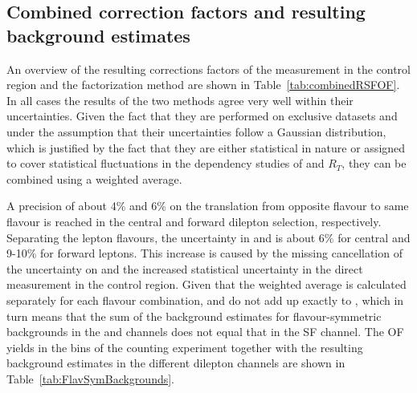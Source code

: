 \subsection{Combined correction factors and resulting background estimates}
\label{sec:combinedRSFOF}
An overview of the resulting corrections factors of the measurement in the control region and the factorization method are shown in Table~\ref{tab:combinedRSFOF}. In all cases the results of the two methods agree very well within their uncertainties. Given the fact that they are performed on exclusive datasets and under the assumption that their uncertainties follow a Gaussian distribution, which is justified by the fact that they are either statistical in nature or assigned to cover statistical fluctuations in the dependency studies of \rmue and $R_T$, they can be combined using a weighted average. 
 
A precision of about 4\% and 6\% on the translation from opposite flavour to same flavour is reached in the central and forward dilepton selection, respectively. Separating the lepton flavours, the uncertainty in \Reeof and \Rmmof is about 6\% for central and 9-10\% for forward leptons. This increase is caused by the missing cancellation of the uncertainty on \rmue and the increased statistical uncertainty in the direct measurement in the control region. Given that the weighted average is calculated separately for each flavour combination, \Reeof and \Rmmof do not add up exactly to \Rsfof, which in turn means that the sum of the background estimates for flavour-symmetric backgrounds in the \EE and \MM channels does not equal that in the SF channel. The OF yields in the \mll bins of the counting experiment together with the resulting background estimates in the different dilepton channels are shown in Table~\ref{tab:FlavSymBackgrounds}. 





